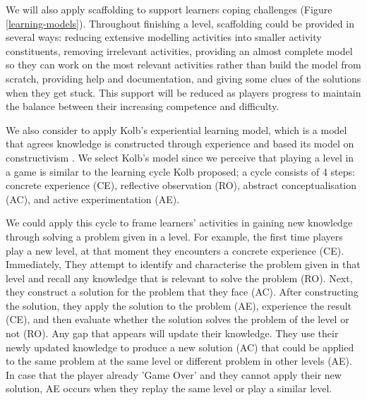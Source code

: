 \documentclass[12pt, a4paper]{report}
\begin{document}
We will also apply scaffolding \cite{vygotsky1978mind, wood1976role} to support learners coping challenges (Figure \ref{learning-models}). Throughout finishing a level, scaffolding could be provided in several ways: reducing extensive modelling activities into smaller activity constituents, removing irrelevant activities, providing an almost complete model so they can work on the most relevant activities rather than build the model from scratch, providing help and documentation, and giving some clues of the solutions when they get stuck. This support will be reduced as players progress to maintain the balance between their increasing competence and difficulty.

We also consider to apply Kolb's experiential learning model, which is a model that agrees knowledge is constructed through experience and based its model on constructivism \cite{kolb2014experiential}. We select Kolb's model since we perceive that playing a level in a game is similar to the learning cycle Kolb proposed; a cycle consists of 4 steps: concrete experience (CE), reflective observation (RO), abstract conceptualisation (AC), and active experimentation (AE). 

We could apply this cycle to frame learners' activities in gaining new knowledge through solving a problem given in a level. For example, the first time players play a new level, at that moment they encounters a concrete experience (CE). Immediately, They attempt to identify and characterise the problem given in that level and recall any knowledge that is relevant to solve the problem (RO). Next, they construct a solution for the problem that they face (AC). After constructing the solution, they apply the solution to the problem (AE), experience the result (CE), and then evaluate whether the solution solves the problem of the level or not (RO). Any gap that appears will update their knowledge. They use their newly updated knowledge to produce a new solution (AC) that could be applied to the same problem at the same level or different problem in other levels (AE). In case that the player already 'Game Over' and they cannot apply their new solution, AE occurs when they replay the same level or play a similar level.
\end{document}
